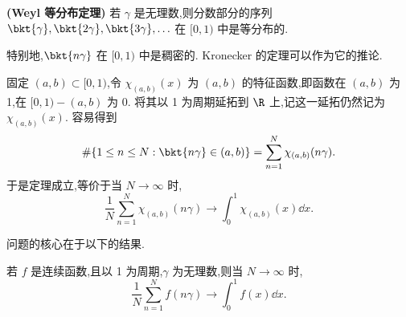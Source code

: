 \begin{theorem}
\textbf{(Weyl 等分布定理)}
若 $\gamma$ 是无理数,则分数部分的序列 $\bkt{\gamma},\bkt{2\gamma},\bkt{3\gamma},\ldots$ 在 $[0,1)$ 中是等分布的.
\label{Weyl等分布定理}
\end{theorem}

特别地,$\bkt{n\gamma}$ 在 $[0,1)$ 中是稠密的. Kronecker 的定理可以作为它的推论.

固定 $(a,b)\subset[0,1)$,令 $\chi_{(a,b)}(x)$ 为 $(a,b)$ 的特征函数,即函数在 $(a,b)$ 为 1,在 $[0,1)-(a,b)$ 为 0. 将其以 1 为周期延拓到 $\R$ 上,记这一延拓仍然记为 $\chi_{(a,b)}(x)$. 容易得到
\[
\#\{1\leq n\leq N:\bkt{n\gamma}\in(a,b)\}=\sum_{n=1}^N\chi_{(a,b)}(n\gamma).
\]
于是定理成立,等价于当 $N\to\infty$ 时,
\[
\frac1N\sum_{n=1}^N\chi_{(a,b)}(n\gamma)\to\int_0^1\chi_{(a,b)}(x)\dd x.
\]

问题的核心在于以下的结果.

\begin{lemma}
若 $f$ 是连续函数,且以 1 为周期,$\gamma$ 为无理数,则当 $N\to\infty$ 时,
\[
\frac1N\sum_{n=1}^N f(n\gamma)\to\int_0^1 f(x)\dd x.
\]
\label{Weyl等分布的核心引理}
\end{lemma}

